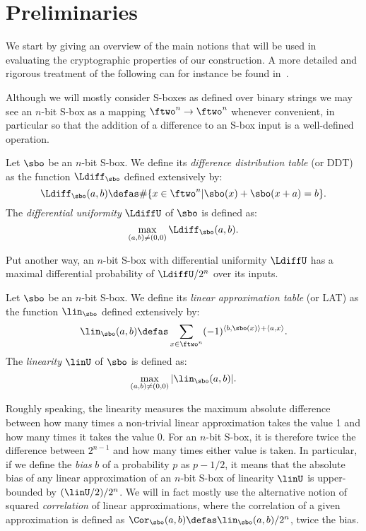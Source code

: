 \section{Preliminaries}
\label{sec:elprelim}

We start by giving an overview of the main notions that will be used in evaluating the cryptographic properties of our construction.
A more detailed and rigorous treatment of the following can for instance be found in~\cite{phdRoue}.

\bigskip

Although we will mostly consider S-boxes as defined over binary strings we may see an $n$-bit S-box as a mapping
$\ftwo^n \rightarrow \ftwo^n$ whenever convenient, in particular so that the addition of a difference to an S-box
input is a well-defined operation.

\begin{defi}
\label{diffS}
Let $\sbo$ be an $n$-bit S-box. We define its
\emph{difference distribution table} (or DDT) as the function $\Ldiff_{\sbo}$ defined extensively by:
\[
\Ldiff_{\sbo}(a,b) \defas \#\{x \in \ftwo^n | \sbo(x) + \sbo(x + a) = b\}.
\]
The \emph{differential uniformity} $\LdiffU$ of $\sbo$ is defined as:
\[
\max_{(a,b) \neq (0,0)} \Ldiff_{\sbo}(a,b).
\]
\end{defi}
Put another way, an $n$-bit S-box with differential uniformity $\LdiffU$ has a maximal differential probability
of $\LdiffU/2^n$ over its inputs.


\begin{defi}
\label{linS}
Let $\sbo$ be an $n$-bit S-box. We define its
\emph{linear approximation table} (or LAT) as the function $\lin_{\sbo}$ defined extensively by:
\[
\lin_{\sbo}(a,b) \defas \sum_{x \in \ftwo^n} (-1)^{\langle b,\sbo(x)\rangle + \langle a, x\rangle}.
\]
The \emph{linearity} $\linU$ of $\sbo$ is defined as:
\[
\max_{(a,b) \neq (0,0)} |\lin_{\sbo}(a,b)|.
\]
\end{defi}
Roughly speaking, the linearity measures the maximum absolute difference between how many times a non-trivial linear approximation
takes the value 1 and how many times it takes the value 0. For an $n$-bit S-box, it is therefore twice the difference between $2^{n-1}$
and how many times either value is taken.
In particular, if we define the \emph{bias} $b$ of a probability $p$ as $p - 1/2$, it means that
the absolute bias of any linear approximation of an $n$-bit S-box of linearity $\linU$ is upper-bounded by $(\linU/2)/2^n$.
We will in fact mostly use the alternative notion of squared \emph{correlation} of linear approximations, 
where the correlation of a given approximation is defined as $\Cor_{\sbo}(a,b) \defas \lin_{\sbo}(a,b)/2^n$, \ie twice the bias.

